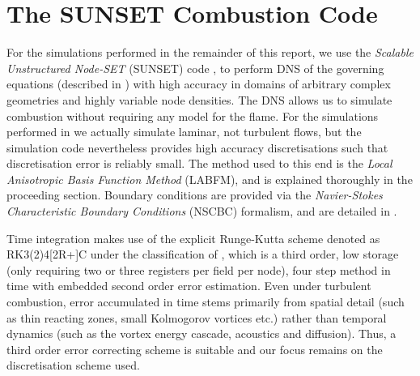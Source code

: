 \section{The SUNSET Combustion Code}

For the simulations performed in the remainder of this report, we use the \emph{Scalable Unstructured Node-SET} (SUNSET) code \cite{kingSunsetFlames,king2024MeshFreeFrameworkHighOrdera}, to perform DNS of the governing equations (described in ) with high accuracy in domains of arbitrary complex geometries and highly variable node densities. The DNS allows us to simulate combustion without requiring any model for the flame. For the simulations performed in  we actually simulate laminar, not turbulent flows, but the simulation code nevertheless provides high accuracy discretisations such that discretisation error is reliably small. The method used to this end is the \emph{Local Anisotropic Basis Function Method} (LABFM), and is explained thoroughly in the proceeding section. Boundary conditions are provided via the \emph{Navier-Stokes Characteristic Boundary Conditions} (NSCBC) formalism, and are detailed in .

Time integration makes use of the explicit Runge-Kutta scheme denoted as RK3(2)4[2R+]C under the classification of \cite{kennedy2000LowStorageExplicitRunge}, which is a third order, low storage (only requiring two or three registers per field per node), four step method in time with embedded second order error estimation. Even under turbulent combustion, error accumulated in time stems primarily from spatial detail (such as thin reacting zones, small Kolmogorov vortices etc.) rather than temporal dynamics (such as the vortex energy cascade, acoustics and diffusion). Thus, a third order error correcting scheme is suitable and our focus remains on the discretisation scheme used.

